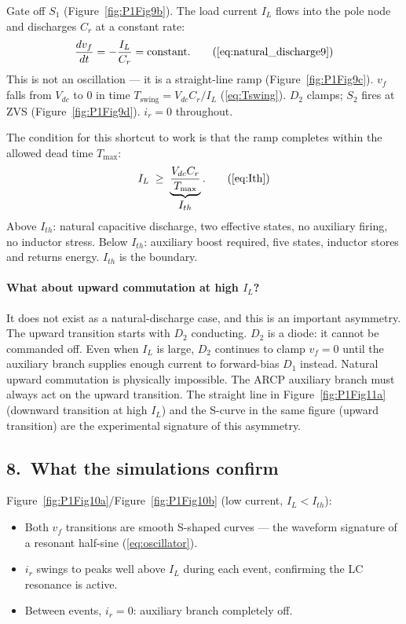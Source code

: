 \documentclass[12pt, a4paper]{article}
\def\,{ }%
\newcommand{\Vdc}{V_{dc}}
\newcommand{\vf}{v_f}
\newcommand{\ir}{i_r}
\newcommand{\IL}{I_L}
\newcommand{\Cr}{C_r}
\newcommand{\Ith}{I_{th}}
\newcommand{\figref}[1]{Figure~\ref{#1}}
\begin{document}
Gate off $S_1$ (\figref{fig:P1Fig9b}).
The load current $\IL$ flows into the pole node and discharges $C_r$ at a
constant rate:
\begin{equation}
    \frac{d\vf}{dt} = -\frac{\IL}{\Cr} = \text{constant}.
    \tag{\ref{eq:natural_discharge9}}
\end{equation}
This is not an oscillation --- it is a straight-line ramp (\figref{fig:P1Fig9c}).
$\vf$ falls from $\Vdc$ to 0 in time $T_\text{swing} = \Vdc C_r / \IL$
(\eqref{eq:Tswing}).
$D_2$ clamps; $S_2$ fires at ZVS (\figref{fig:P1Fig9d}).
$\ir = 0$ throughout.

The condition for this shortcut to work is that the ramp completes within the
allowed dead time $T_\text{max}$:
\begin{equation}
    \IL \;\geq\; \underbrace{\frac{\Vdc\,\Cr}{T_\text{max}}}_{\displaystyle\Ith}.
    \tag{\ref{eq:Ith}}
\end{equation}
Above $\Ith$: natural capacitive discharge, two effective states, no auxiliary
firing, no inductor stress.
Below $\Ith$: auxiliary boost required, five states, inductor stores and
returns energy.
$\Ith$ is the boundary.

\paragraph{What about upward commutation at high $\IL$?}

It does not exist as a natural-discharge case, and this is an important
asymmetry.
The upward transition starts with $D_2$ conducting.
$D_2$ is a diode: it cannot be commanded off.
Even when $\IL$ is large, $D_2$ continues to clamp $\vf = 0$ until the
auxiliary branch supplies enough current to forward-bias $D_1$ instead.
Natural upward commutation is physically impossible.
The ARCP auxiliary branch must always act on the upward transition.
The straight line in \figref{fig:P1Fig11a} (downward transition at high $\IL$)
and the S-curve in the same figure (upward transition) are the
experimental signature of this asymmetry.

\subsection*{8.\ What the simulations confirm}

\figref{fig:P1Fig10a}/\figref{fig:P1Fig10b} (low current, $\IL < \Ith$):
\begin{itemize}
    \item Both $\vf$ transitions are smooth S-shaped curves --- the waveform
          signature of a resonant half-sine (\eqref{eq:oscillator}).
    \item $\ir$ swings to peaks well above $\IL$ during each event,
          confirming the LC resonance is active.
    \item Between events, $\ir = 0$: auxiliary branch completely off.
\end{itemize}
\end{document}
